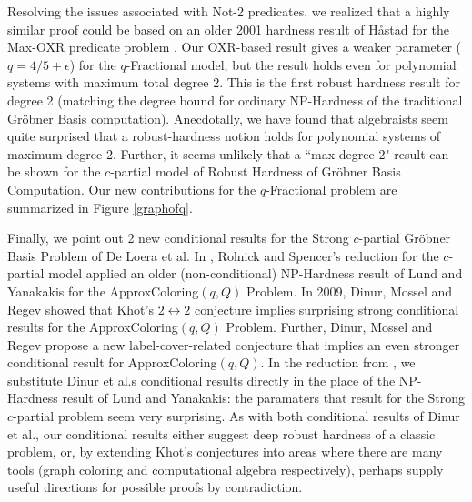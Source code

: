 \documentclass{article}
\begin{document}
Resolving the issues associated with Not-2 predicates, we realized that a highly similar proof could be based on an older 2001 hardness result of H{\aa}stad for the Max-OXR predicate problem \citep{hast01}. Our OXR-based result gives a weaker parameter ($q=4/5+\epsilon$) for the $q$-Fractional model, but the result holds even 
for polynomial systems with maximum total degree 2. This is the first robust hardness result for degree 2 (matching the degree bound for ordinary NP-Hardness of the traditional Gr\"{o}bner Basis computation). Anecdotally, we have found that algebraists seem quite surprised that a robust-hardness notion holds for polynomial systems of maximum degree 2. Further, it seems unlikely that a ``max-degree 2" result can be shown for the $c$-partial model of Robust Hardness of Gr\"{o}bner Basis Computation.
Our new contributions for the $q$-Fractional problem are summarized in Figure \ref{graphofq}.





Finally, we point out 2 new conditional results for the Strong $c$-partial Gr\"{o}bner Basis Problem of De Loera et al.  In \citep{RS}, Rolnick and Spencer's reduction for the $c$-partial model applied an older (non-conditional) NP-Hardness result of Lund and Yanakakis \citep{Lundyan} for the ApproxColoring$(q,Q)$ Problem.
In 2009, Dinur, Mossel and Regev \citep{dinur} showed that Khot's $2\leftrightarrow 2$ conjecture implies surprising strong conditional results for the ApproxColoring$(q,Q)$ Problem. Further, Dinur, Mossel and Regev propose a new label-cover-related conjecture that implies an even stronger conditional result for ApproxColoring$(q,Q)$. In the reduction from \citep{RS}, we substitute Dinur et al.s conditional results directly in the place of the NP-Hardness result of Lund and Yanakakis: the paramaters that result for the Strong $c$-partial problem seem very surprising. As with both conditional results of Dinur et al., our conditional results either suggest deep robust hardness of a classic problem, or, by extending Khot's conjectures into areas where there are many tools (graph coloring and computational algebra respectively), perhaps supply useful directions for possible proofs by contradiction.
\end{document}
